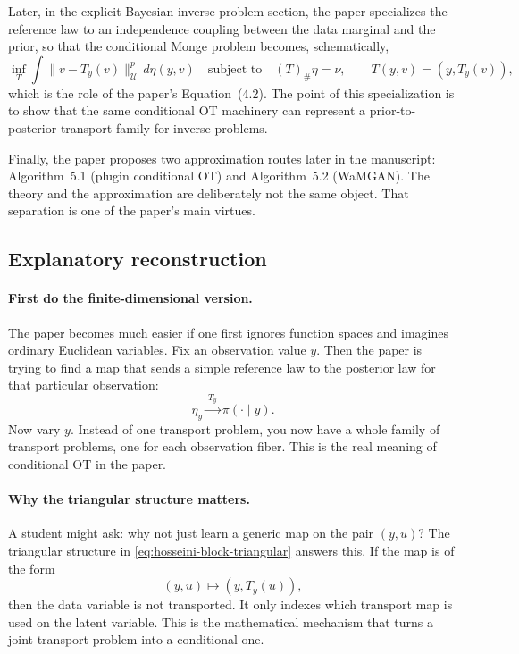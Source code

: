 \documentclass[11pt]{report}
\newcommand{\pushf}[2]{\left(#1\right)_{\#} #2}
\begin{document}
Later, in the explicit Bayesian-inverse-problem section, the paper specializes the
reference law to an independence coupling between the data marginal and the prior,
so that the conditional Monge problem becomes, schematically,
\begin{equation}
\inf_{T}
\int \|v-T_y(v)\|_{\mathcal U}^{p}\,d\eta(y,v)
\quad\text{subject to}\quad
\pushf{T}{\eta}=\nu,
\qquad
T(y,v)=(y,T_y(v)),
\label{eq:hosseini-bip-monge}
\end{equation}
which is the role of the paper's Equation~(4.2).  The point of this specialization
is to show that the same conditional OT machinery can represent a prior-to-posterior
transport family for inverse problems.

Finally, the paper proposes two approximation routes later in the manuscript:
Algorithm~5.1 (plugin conditional OT) and Algorithm~5.2 (WaMGAN).  The theory and
the approximation are deliberately not the same object.  That separation is one of
the paper's main virtues.

\subsection*{Explanatory reconstruction}

\paragraph{First do the finite-dimensional version.}
The paper becomes much easier if one first ignores function spaces and imagines
ordinary Euclidean variables.  Fix an observation value $y$.  Then the paper is
trying to find a map that sends a simple reference law to the posterior law for
that particular observation:
\begin{equation}
\eta_y \xrightarrow{\ T_y\ } \pi(\cdot\mid y).
\label{eq:hosseini-fiber-picture}
\end{equation}
Now vary $y$.  Instead of one transport problem, you now have a whole family of
transport problems, one for each observation fiber.  This is the real meaning of
conditional OT in the paper.

\paragraph{Why the triangular structure matters.}
A student might ask: why not just learn a generic map on the pair $(y,u)$?  The
triangular structure in \eqref{eq:hosseini-block-triangular} answers this.  If the
map is of the form
\begin{equation}
(y,u)\mapsto (y,T_y(u)),
\label{eq:triangular-explicit}
\end{equation}
then the data variable is not transported.  It only indexes which transport map is
used on the latent variable.  This is the mathematical mechanism that turns a joint
transport problem into a conditional one.
\end{document}
